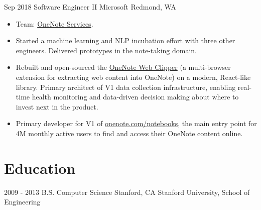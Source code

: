 \documentclass[letterpaper]{twentysecondcv} %
\begin{document}
\begin{twenty}
		{Sep 2018}
        {Software Engineer II}
        {Microsoft}
        {Redmond, WA}
        {
        {\begin{itemize} \itemsep 2pt %
        \item Team: \href{https://www.onenote.com/}{OneNote Services}.
        \item Started a machine learning and NLP incubation effort with three other engineers. Delivered prototypes in the note-taking domain.
        \item Rebuilt and open-sourced the \href{https://github.com/OneNoteDev/WebClipper}{OneNote Web Clipper} (a multi-browser extension for extracting web content into OneNote) on a modern, React-like library. Primary architect of V1 data collection infrastructure, enabling real-time health monitoring and data-driven decision making about where to invest next in the product.
        \item Primary developer for V1 of \href{https://www.onenote.com/notebooks}{onenote.com/notebooks}, the main entry point for 4M monthly active users to find and access their OneNote content online.
        \end{itemize}}
        }

\end{twenty}

\section{Education}

\begin{twenty} %
	\twentyitem
    	{2009 - 2013}
		{}
        {B.S. Computer Science}
        {Stanford, CA}
        {}
        {Stanford University, School of Engineering}
\end{twenty}

\end{document}
